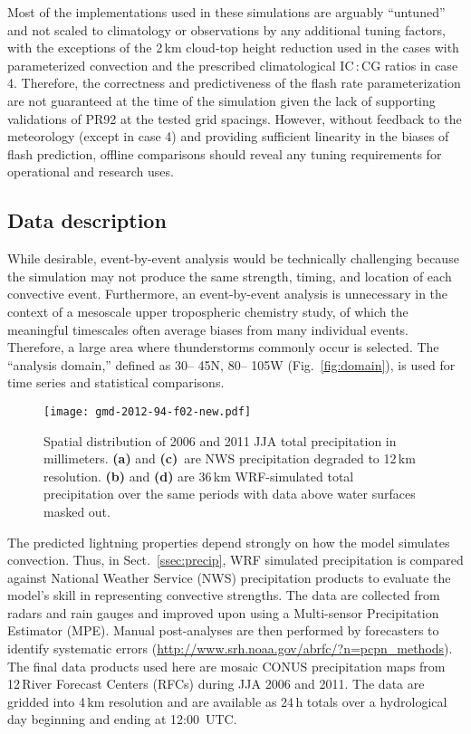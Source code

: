 Most of the implementations used in these simulations are arguably
``untuned'' and not scaled to climatology or observations by any additional
tuning factors, with the exceptions of the 2\,\unit{km} cloud-top height
reduction used in the cases with parameterized convection and the prescribed
climatological IC\,:\,CG ratios in case 4. Therefore, the correctness and
predictiveness of the flash rate parameterization are not guaranteed at the
time of the simulation given the lack of supporting validations of PR92 at
the tested grid spacings. However, without feedback to the meteorology
(except in case 4) and providing sufficient linearity in the biases of flash
prediction, offline comparisons should reveal any tuning requirements for
operational and research uses.

\subsection{Data description}\label{ssec:data}

While desirable, event-by-event analysis would be technically challenging
because the simulation may not produce the same strength, timing, and
location of each convective event. Furthermore, an event-by-event analysis is
unnecessary in the context of a mesoscale upper tropospheric chemistry study,
of which the meaningful timescales often average biases from many individual
events. Therefore, a large area where thunderstorms commonly occur is
selected. The ``analysis domain,'' defined as 30\degree -- 45\degree N,
80\degree -- 105\degree W (Fig.~\ref{fig:domain}), is used for time series
and statistical comparisons.


\begin{figure*}[t]
\texttt{[image: gmd-2012-94-f02-new.pdf]}
\caption{Spatial distribution of 2006 and 2011 JJA total precipitation in
millimeters. \textbf{(a)} and \textbf{(c)}~are NWS precipitation degraded to
12\,\unit{km} resolution. \textbf{(b)} and \textbf{(d)} are 36\,\unit{km}
WRF-simulated total precipitation over the same periods with data above water
surfaces masked out.} \label{fig:precipmap}
\end{figure*}



The predicted lightning properties depend strongly on how the model simulates
convection. Thus, in Sect.~\ref{ssec:precip}, WRF simulated precipitation
is compared against National Weather Service (NWS) precipitation products to
evaluate the model's skill in representing convective strengths. The data are
collected from radars and rain gauges and \mbox{improved} upon using a Multi-sensor
Precipitation Estimator (MPE). Manual post-analyses are then performed by
forecasters to identify systematic errors
(\url{http://www.srh.noaa.gov/abrfc/?n=pcpn\_methods}). The final data products
used here are mosaic CONUS precipitation maps from 12\,River Forecast Centers
(RFCs) during JJA 2006 and 2011. The data are gridded into 4\,\unit{km}
resolution and are available as 24\,h totals over a hydrological day
beginning and ending at 12:00~UTC.

